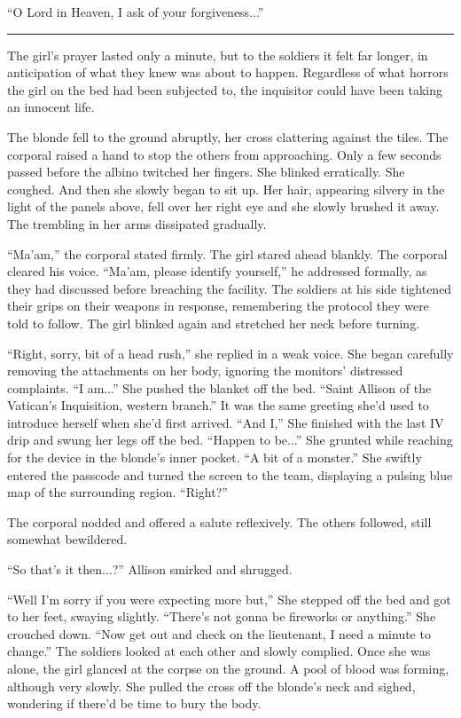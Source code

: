 \begin{Standard}
``O Lord in Heaven, I ask of your forgiveness...''

\fancybreak{* * *}

The girl's prayer lasted only a minute, but to the soldiers it felt far longer, in
anticipation of what they knew was about to happen. Regardless of what horrors
the girl on the bed had been subjected to, the inquisitor could have been taking an
innocent life.

The blonde fell to the ground abruptly, her cross clattering against the tiles. The
corporal raised a hand to stop the others from approaching. Only a few seconds passed
before the albino twitched her fingers. She blinked erratically. She coughed. And then
she slowly began to sit up. Her hair, appearing silvery in the light of the panels above,
fell over her right eye and she slowly brushed it away. The trembling in her arms
dissipated gradually.

``Ma'am,'' the corporal stated firmly. The girl stared ahead blankly. The corporal
cleared his voice. ``Ma'am, please identify yourself,'' he addressed formally, as they
had discussed before breaching the facility. The soldiers at his side tightened their grips
on their weapons in response, remembering the protocol they were told to follow. The girl
blinked again and stretched her neck before turning.

``Right, sorry, bit of a head rush,'' she replied in a weak voice. She began carefully
removing the attachments on her body, ignoring the monitors' distressed complaints.
``I am...'' She pushed the blanket off the bed. ``Saint Allison of the Vatican's Inquisition,
western branch.'' It was the same greeting she'd used to introduce herself when she'd
first arrived. ``And I,'' She finished with the last IV drip and swung her legs off the bed.
``Happen to be...'' She grunted while reaching for the device in the blonde's inner pocket.
``A bit of a monster.'' She swiftly entered the passcode and turned the screen to the team,
displaying a pulsing blue map of the surrounding region. ``Right?''

The corporal nodded and offered a salute reflexively. The others followed, still
somewhat bewildered.

``So that's it then...?'' Allison smirked and shrugged.

``Well I'm sorry if you were expecting more but,'' She stepped off the bed and got
to her feet, swaying slightly. ``There's not gonna be fireworks or anything.''
She crouched down. ``Now get out and check on the lieutenant, I need a minute to change.''
The soldiers looked at each other and slowly complied. Once she was alone, the girl
glanced at the corpse on the ground. A pool of blood was forming, although very slowly.
She pulled the cross off the blonde's neck and sighed, wondering if there'd be time
to bury the body.


\end{Standard}

